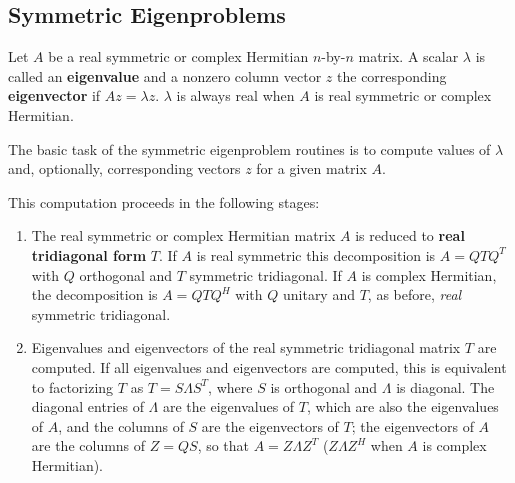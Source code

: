 
\subsection{Symmetric Eigenproblems}\label{subseccompsep}

Let $A$ be a real symmetric
or complex Hermitian $n$-by-$n$ matrix.
A scalar $\lambda$ is called an {\bf eigenvalue} and a nonzero column vector
$z$ the corresponding {\bf eigenvector} if $Az = \lambda z$. $\lambda$ is
always real when $A$ is real symmetric or complex Hermitian.

The basic task of the symmetric eigenproblem routines is to compute values of $\lambda$
and, optionally, corresponding vectors $z$ for a given matrix $A$.

This computation proceeds in the following stages:

\begin{enumerate}
\item The real symmetric or complex Hermitian matrix $A$ is reduced to
{\bf real tridiagonal form}
$T$.
If $A$ is real symmetric this decomposition is $A=QTQ^T$ with $Q$ orthogonal
and $T$ symmetric tridiagonal.
If $A$ is complex Hermitian, the
decomposition is $A=QTQ^H$ with $Q$ unitary and $T$, as before,
{\it real} symmetric tridiagonal.

\item Eigenvalues and eigenvectors of the real symmetric tridiagonal matrix
$T$ are computed.
If all eigenvalues and eigenvectors are computed, this is equivalent to
factorizing $T$ as
$T = S \Lambda S^T$, where $S$ is orthogonal and $\Lambda$ is diagonal.
The diagonal entries of $\Lambda$ are the eigenvalues of $T$, which are also
the eigenvalues of $A$, and the
columns of $S$ are the eigenvectors of $T$; the eigenvectors of $A$ are
the columns of $Z=QS$, so that $A=Z \Lambda Z^T$ ($Z \Lambda Z^H$ when
$A$ is complex Hermitian).

\end{enumerate}

